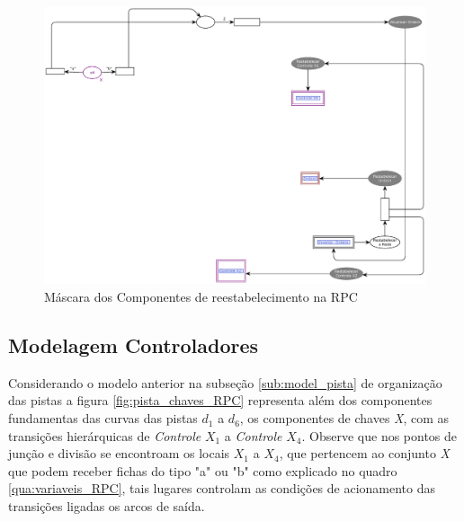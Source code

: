 \begin{figure}[ht]
    \centering
    \caption{Máscara dos Componentes de reestabelecimento na RPC}
    \label{fig:restabelecer_geral}
    \includegraphics[width=1\linewidth]{figures/Simulation/Modelagem/restabelecer_geral.eps}
\end{figure}

\clearpage
\subsection{Modelagem Controladores}
Considerando o modelo anterior na subseção \ref{sub:model_pista} de organização das pistas a figura \ref{fig:pista_chaves_RPC} representa além dos componentes fundamentas das curvas das pistas $d_1$ a $d_6$, os componentes de chaves \textit{X}, com as transições hierárquicas de \textit{Controle} $X_1$ a \textit{Controle} $X_4$. Observe que nos pontos de junção e divisão se encontroam os locais $X_1$ a $X_4$, que pertencem ao conjunto \textit{X} que podem receber fichas do tipo "a" ou "b" como explicado no quadro \ref{qua:variaveis_RPC}, tais lugares controlam as condições de acionamento das transições ligadas os arcos de saída. 

